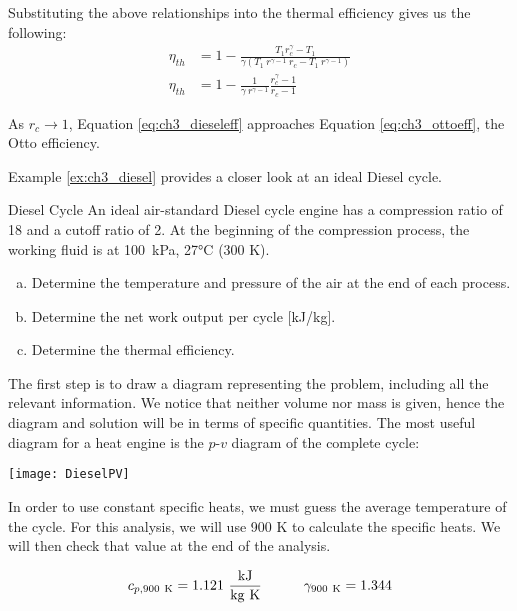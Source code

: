 Substituting the above relationships into the thermal efficiency gives us the following:
\begin{align}
  \nonumber \eta_{th} &= 1 - \frac{T_1 r_c^{\gamma} - T_1}{\gamma \left(T_1 \: r^{\gamma-1}\: r_c -  T_1\: r^{\gamma-1}\right)} \\
  \label{eq:ch3_dieseleff} \eta_{th} &= 1 - \frac{1}{\gamma\:r^{\gamma-1}}\frac{r_c^{\gamma} - 1}{r_c -  1}
\end{align}

As $r_c\rightarrow 1$, Equation \ref{eq:ch3_dieseleff} approaches Equation \ref{eq:ch3_ottoeff}, the Otto efficiency.

Example \ref{ex:ch3_diesel} provides a closer look at an ideal Diesel cycle.

\begin{example}[label=ex:ch3_diesel]{Diesel Cycle}
  An ideal air-standard Diesel cycle engine has a compression ratio of 18 and a cutoff ratio of 2. At the beginning of the compression process, the working fluid is at \mbox{100 kPa}, 27°C (300 K).
\begin{enumerate}[a)]
\item Determine the temperature and pressure of the air at the end of each process.
\item Determine the net work output per cycle [kJ/kg].
\item Determine the thermal efficiency.
\end{enumerate}

The first step is to draw a diagram representing the problem, including all the relevant information. We notice that neither volume nor mass is given, hence the diagram and solution will be in terms of specific quantities. The most useful diagram for a heat engine is the $p$-$v$ diagram of the complete cycle:

\begin{center}
\texttt{[image: DieselPV]}
\end{center}

In order to use constant specific heats, we must guess the average temperature of the cycle.  For this analysis, we will use 900 K to calculate the specific heats.  We will then check that value at the end of the analysis.

\begin{equation*}
  c_{p,900\rm\ K} = 1.121\ \frac{\rm kJ}{\rm kg\ K} \quad\quad\quad \gamma_{900\rm\ K} = 1.344
\end{equation*}


\end{example}
